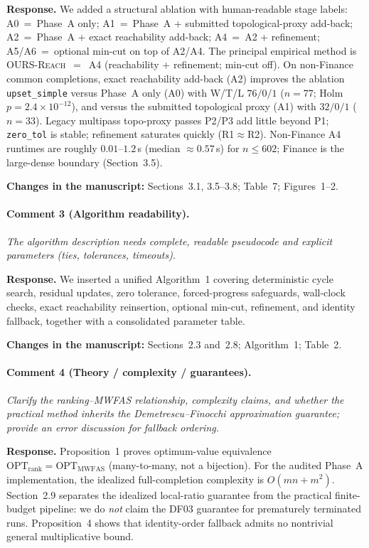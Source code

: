 \documentclass[11pt]{article}
\newcommand{\commentbox}[1]{\par\textit{#1}\par\medskip}
\newcommand{\changes}[1]{\textbf{Changes in the manuscript:} #1\par\medskip}
\begin{document}
\noindent\textbf{Response.}
We added a structural ablation with human-readable stage labels:
A0~=~Phase~A only; A1~=~Phase~A + submitted topological-proxy add-back; A2~=~Phase~A + exact reachability add-back; A4~=~A2 + refinement; A5/A6~=~optional min-cut on top of A2/A4.
The principal empirical method is \textsc{OURS-Reach}~$=$~A4 (reachability + refinement; min-cut off).
On non-Finance common completions, exact reachability add-back (A2) improves the ablation \texttt{upset\_simple} versus Phase~A only (A0) with W/T/L $76/0/1$ ($n=77$; Holm $p=2.4\times 10^{-12}$), and versus the submitted topological proxy (A1) with $32/0/1$ ($n=33$). Legacy multipass topo-proxy passes P2/P3 add little beyond P1; \texttt{zero\_tol} is stable; refinement saturates quickly (R1$\approx$R2). Non-Finance A4 runtimes are roughly $0.01$--$1.2$\,s (median $\approx 0.57$\,s) for $n\le 602$; Finance is the large-dense boundary (Section~3.5).

\changes{Sections~3.1, 3.5--3.8; Table~7; Figures~1--2.}

\paragraph{Comment 3 (Algorithm readability).}
\commentbox{The algorithm description needs complete, readable pseudocode and explicit parameters (ties, tolerances, timeouts).}

\noindent\textbf{Response.}
We inserted a unified Algorithm~1 covering deterministic cycle search, residual updates, zero tolerance, forced-progress safeguards, wall-clock checks, exact reachability reinsertion, optional min-cut, refinement, and identity fallback, together with a consolidated parameter table.

\changes{Sections~2.3 and~2.8; Algorithm~1; Table~2.}

\paragraph{Comment 4 (Theory / complexity / guarantees).}
\commentbox{Clarify the ranking--MWFAS relationship, complexity claims, and whether the practical method inherits the Demetrescu--Finocchi approximation guarantee; provide an error discussion for fallback ordering.}

\noindent\textbf{Response.}
Proposition~1 proves optimum-value equivalence $\mathrm{OPT}_{\mathrm{rank}}=\mathrm{OPT}_{\mathrm{MWFAS}}$ (many-to-many, not a bijection). For the audited Phase~A implementation, the idealized full-completion complexity is $O(mn+m^{2})$. Section~2.9 separates the idealized local-ratio guarantee from the practical finite-budget pipeline: we do \emph{not} claim the DF03 guarantee for prematurely terminated runs. Proposition~4 shows that identity-order fallback admits no nontrivial general multiplicative bound.
\end{document}
